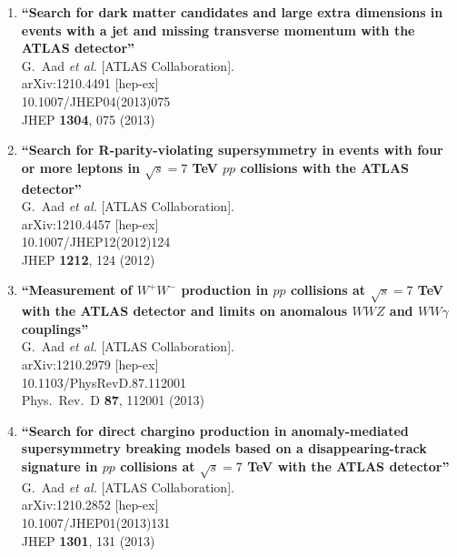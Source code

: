\documentclass{article}
\begin{document}
\begin{enumerate}
\item%
{\bf ``Search for dark matter candidates and large extra dimensions in events with a jet and missing transverse momentum with the ATLAS detector''}
  \\{}G.~Aad {\it et al.}  [ATLAS Collaboration].
  \\{}arXiv:1210.4491 [hep-ex]
    \\{}10.1007/JHEP04(2013)075
\\{}JHEP {\bf 1304}, 075 (2013) %


\item%
{\bf ``Search for R-parity-violating supersymmetry in events with four or more leptons in $\sqrt{s}=7$ TeV $pp$ collisions with the ATLAS detector''}
  \\{}G.~Aad {\it et al.}  [ATLAS Collaboration].
  \\{}arXiv:1210.4457 [hep-ex]
    \\{}10.1007/JHEP12(2012)124
\\{}JHEP {\bf 1212}, 124 (2012) %


\item%
{\bf ``Measurement of $W^+W^-$ production in $pp$ collisions at $\sqrt{s}=7$ TeV with the ATLAS detector and limits on anomalous $WWZ$ and $WW\gamma$ couplings''}
  \\{}G.~Aad {\it et al.}  [ATLAS Collaboration].
  \\{}arXiv:1210.2979 [hep-ex]
    \\{}10.1103/PhysRevD.87.112001
\\{}Phys.\ Rev.\ D {\bf 87}, 112001 (2013) %


\item%
{\bf ``Search for direct chargino production in anomaly-mediated supersymmetry breaking models based on a disappearing-track signature in $pp$ collisions at $\sqrt{s}=7$ TeV with the ATLAS detector''}
  \\{}G.~Aad {\it et al.}  [ATLAS Collaboration].
  \\{}arXiv:1210.2852 [hep-ex]
    \\{}10.1007/JHEP01(2013)131
\\{}JHEP {\bf 1301}, 131 (2013) %



\end{enumerate}
\end{document}
